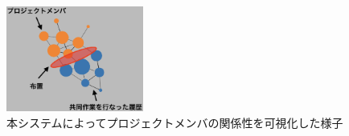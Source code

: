\begin{figure}[h]
  \centering
  \includegraphics[width=0.4\textwidth]{img/cop-map.eps}
  \caption{本システムによってプロジェクトメンバの関係性を可視化した様子}
  \label{cop-map-graph}
\end{figure}
